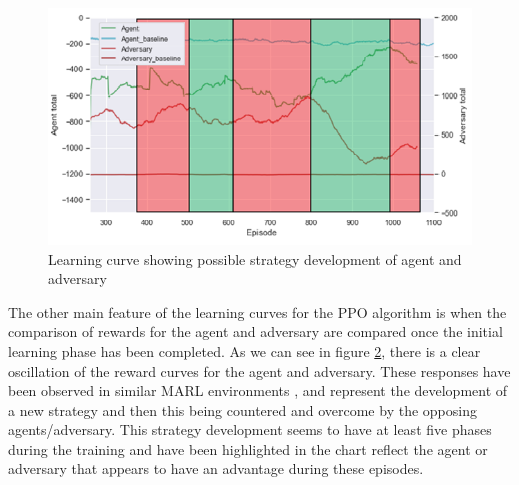 \documentclass{article}
\begin{document}
\begin{figure}[!ht]
\begin{minipage}{.5\linewidth}
    \label{fig:PPOCOMM}
  \end{minipage}
\end{figure}




\begin{figure}[!ht]
  \centering
  \includegraphics[scale=.7]{strat_development.PNG}
  \caption{Learning curve showing possible strategy development of agent and adversary}
  \label{fig:STRATLEARN}
\end{figure}

The other main feature of the learning curves for the PPO algorithm is when the comparison of rewards for the agent and adversary are compared once the initial learning phase has been completed.
As we can see in figure \ref{fig:STRATLEARN}, there is a clear oscillation of the reward curves for the agent and adversary.
These responses have been observed in similar MARL environments \citep{emergenttoolusage}, and represent the development of a new strategy and then this being countered and overcome by the opposing agents/adversary.
This strategy development seems to have at least five phases during the training and have been highlighted in the chart reflect the agent or adversary that appears to have an advantage during these episodes.
\end{document}
